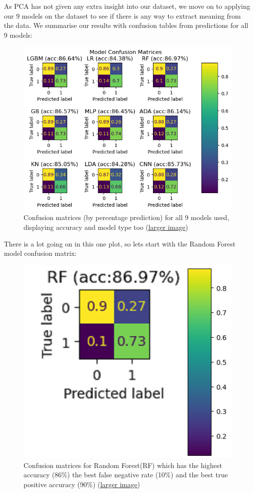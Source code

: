 \documentclass[]{article}
\newcommand{\winningaccuracy}{86\%\xspace}
\newcommand{\winningtpaccuracy}{90\%\xspace}
\newcommand{\winningfnrate}{10\%\xspace}
\newcommand{\winningmodelshort}{RF\xspace}
\newcommand{\winningmodellong}{Random Forest\xspace}
\begin{document}
As PCA has not given any extra insight into our dataset, we move on to applying our 9 models on the dataset to see if there is any way to extract meaning from the data. We summarise our results with confusion tables from predictions for all 9 models:

\begin{figure}[h!]
	\centering
	\includegraphics[scale=0.6]{9cm}
	\caption{Confusion matrices (by percentage prediction) for all 9 models used, displaying accuracy and model type too (\href{https://github.com/ray33ee/Understanding-predicting-and-preventing-churn/blob/main/tex/9cm.png?raw=true}{larger image})}
\end{figure}

There is a lot going on in this one plot, so lets start with the \winningmodellong model confusion matrix:

\begin{figure}[h!]
	\centering
	\includegraphics[scale=1]{rf_cm}
	\caption{Confusion matrices  for \winningmodellong (\winningmodelshort) which has the highest accuracy (\winningaccuracy) the best false negative rate (\winningfnrate) and the best true positive accuracy (\winningtpaccuracy) (\href{https://github.com/ray33ee/Understanding-predicting-and-preventing-churn/blob/main/tex/rf_cm.png?raw=true}{larger image})}
\end{figure}
\end{document}
